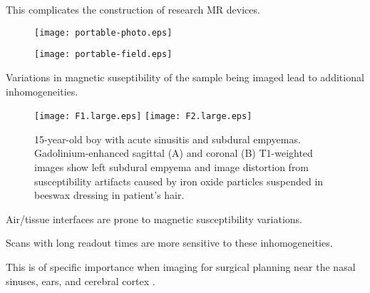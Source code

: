 \documentclass[xcolor=dvipsnames]{beamer}
\theoremstyle{remark}
\begin{document}
\begin{frame}
This complicates the construction of research MR devices.

\begin{center}
\begin{figure}
\texttt{[image: portable-photo.eps]}
\end{figure}
\end{center}
\end{frame}

\begin{frame}
\begin{center}
\begin{figure}
\texttt{[image: portable-field.eps]}
\end{figure}
\end{center}

\end{frame}

\begin{frame}

Variations in magnetic suseptibility of the sample being imaged lead to additional inhomogeneities.
\pause
\begin{center}
\begin{figure}
\texttt{[image: F1.large.eps]}
\texttt{[image: F2.large.eps]}
\caption{15-year-old boy with acute sinusitis and subdural empyemas. Gadolinium-enhanced sagittal (A) and coronal (B) T1-weighted images show left subdural empyema and image distortion from susceptibility artifacts caused by iron oxide particles suspended in beeswax dressing in patient's hair.}
\end{figure}
\end{center}

\end{frame}

\begin{frame}

Air/tissue interfaces are prone to magnetic susceptibility variations.

\pause

Scans with long readout times are more sensitive to these inhomogeneities.

\pause

This is of specific importance when imaging for surgical planning near the nasal sinuses, ears, and cerebral cortex \cite{Moerland1995} \cite{Neufeld2005}.


\end{frame}
\end{document}
